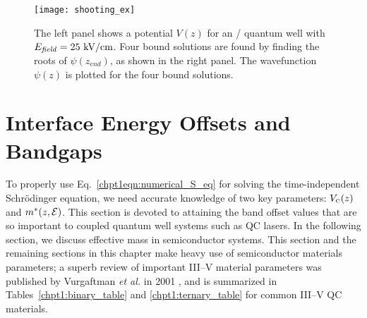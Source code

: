 \begin{figure}[tp]
\centering
\texttt{[image: shooting\_ex]}
\caption[Example use of the shooting method]{  The left panel shows a potential $V(z)$ for an \InGaAs / \AlInAs quantum well with $E_{\textnormal{\textit{field}}}=25~\textnormal{kV/cm}$.  Four bound solutions are found by finding the roots of $\psi(z_{end})$, as shown in the right panel. The wavefunction $\psi(z)$ is plotted for the four bound solutions.}
\label{chpt1:shooting_example}
\end{figure}


\section{Interface Energy Offsets and Bandgaps}

To properly use Eq.~\eqref{chpt1eqn:numerical_S_eq} for solving the time-independent Schr\"{o}dinger equation, we need accurate knowledge of two key parameters: $V_{\textnormal{\tiny{C}}}(z)$ and $m^*(z,\EE)$.  This section is devoted to attaining the band offset values that are so important to coupled quantum well systems such as QC lasers.  In the following section, we discuss effective mass in semiconductor systems.  This section and the remaining sections in this chapter make heavy use of semiconductor materials parameters; a superb review of important III--V material parameters was published by Vurgaftman \emph{et al.} in 2001 \cite{Vurgaftman}, and is summarized in Tables~\ref{chpt1:binary_table} and \ref{chpt1:ternary_table} for common III--V QC materials.

